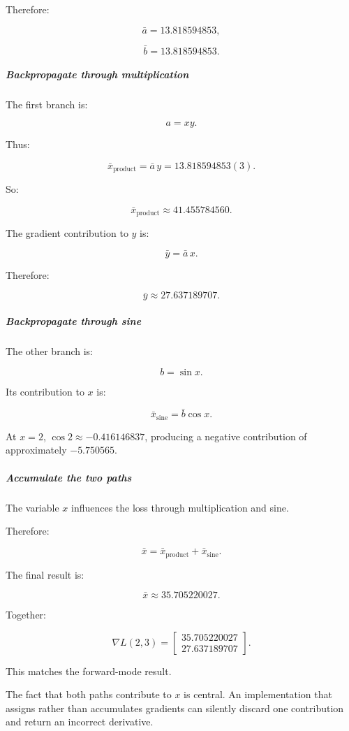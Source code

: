 Therefore:

\[
\boxed{\bar a=13.818594853},
\]

\[
\boxed{\bar b=13.818594853}.
\]

\subparagraph{Backpropagate through multiplication}\label{backpropagate-through-multiplication}

The first branch is:

\[
a=xy.
\]

Thus:

\[
\bar x_{\text{product}} = \bar a\,y = 13.818594853(3).
\]

So:

\[
\bar x_{\text{product}} \approx41.455784560.
\]

The gradient contribution to \(y\) is:

\[
\bar y=\bar a\,x.
\]

Therefore:

\[
\boxed{\bar y\approx27.637189707}.
\]

\subparagraph{Backpropagate through sine}\label{backpropagate-through-sine}

The other branch is:

\[
b=\sin x.
\]

Its contribution to \(x\) is:

\[
\bar x_{\text{sine}} = \bar b\cos x.
\]

At \(x=2\), \(\cos2\approx-0.416146837\), producing a negative contribution of approximately \(-5.750565\).

\subparagraph{Accumulate the two paths}\label{accumulate-the-two-paths}

The variable \(x\) influences the loss through multiplication and sine.

Therefore:

\[
\bar x = \bar x_{\text{product}} + \bar x_{\text{sine}}.
\]

The final result is:

\[
\boxed{\bar x\approx35.705220027}.
\]

Together:

\[
\boxed{ \nabla L(2,3)= \begin{bmatrix} 35.705220027\\ 27.637189707 \end{bmatrix} }.
\]

This matches the forward-mode result.

The fact that both paths contribute to \(x\) is central. An implementation that assigns rather than accumulates gradients can silently discard one contribution and return an incorrect derivative.


